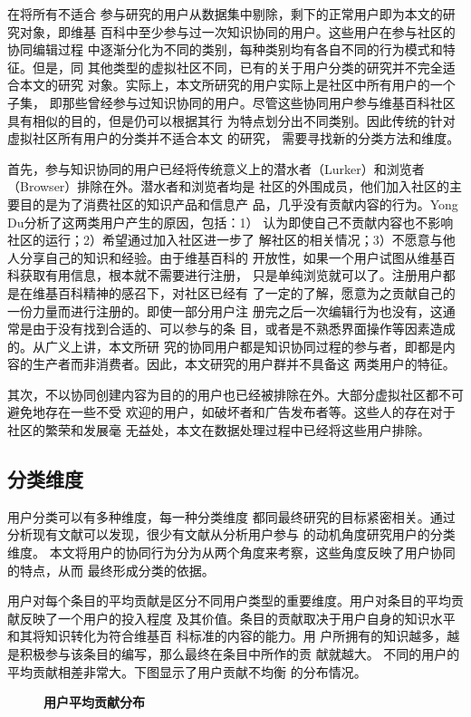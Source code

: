 在将所有不适合
参与研究的用户从数据集中剔除，剩下的正常用户即为本文的研究对象，即维基
百科中至少参与过一次知识协同的用户。这些用户在参与社区的协同编辑过程
中逐渐分化为不同的类别，每种类别均有各自不同的行为模式和特征。但是，同
其他类型的虚拟社区不同，已有的关于用户分类的研究并不完全适合本文的研究
对象。实际上，本文所研究的用户实际上是社区中所有用户的一个子集，
即那些曾经参与过知识协同的用户。尽管这些协同用户参与维基百科社区具有相似的目的，但是仍可以根据其行
为特点划分出不同类别。因此传统的针对虚拟社区所有用户的分类并不适合本文
的研究，
需要寻找新的分类方法和维度。

首先，参与知识协同的用户已经将传统意义上的潜水者（Lurker）和浏览者
（Browser）排除在外。潜水者和浏览者均是
社区的外围成员，他们加入社区的主要目的是为了消费社区的知识产品和信息产
品，几乎没有贡献内容的行为。Yong Du分析了这两类用户产生的原因，包括：1）
认为即使自己不贡献内容也不影响社区的运行；2）希望通过加入社区进一步了
解社区的相关情况；3）不愿意与他人分享自己的知识和经验\cite{4052703}。由于维基百科的
开放性，如果一个用户试图从维基百科获取有用信息，根本就不需要进行注册，
只是单纯浏览就可以了。注册用户都是在维基百科精神的感召下，对社区已经有
了一定的了解，愿意为之贡献自己的一份力量而进行注册的。即使一部分用户注
册完之后一次编辑行为也没有，这通常是由于没有找到合适的、可以参与的条
目，或者是不熟悉界面操作等因素造成的。从广义上讲，本文所研
究的协同用户都是知识协同过程的参与者，即都是内容的生产者而非消费者。因此，本文研究的用户群并不具备这
两类用户的特征。

其次，不以协同创建内容为目的的用户也已经被排除在外。大部分虚拟社区都不可避免地存在一些不受
欢迎的用户，如破坏者和广告发布者等。这些人的存在对于社区的繁荣和发展毫
无益处，本文在数据处理过程中已经将这些用户排除。



\subsection{分类维度}
\label{sec:dimension}
用户分类可以有多种维度，每一种分类维度
都同最终研究的目标紧密相关。通过分析现有文献可以发现，很少有文献从分析用户参与
的动机角度研究用户的分类维度。
本文将用户的协同行为分为从两个角度来考察，这些角度反映了用户协同的特点，从而
最终形成分类的依据。

用户对每个条目的平均贡献是区分不同用户类型的重要维度。用户对条目的平均贡献反映了一个用户的投入程度
及其价值。条目的贡献取决于用户自身的知识水平和其将知识转化为符合维基百
科标准的内容的能力。用
户所拥有的知识越多，越是积极参与该条目的编写，那么最终在条目中所作的贡
献就越大。
不同的用户的平均贡献相差非常大。下图显示了用户贡献不均衡
的分布情况。
\begin{figure}[!htb]
   \centering
   
\caption{\small{\textbf{用户平均贡献分布}}}
 \label{fig:con-detri}
\end{figure}

